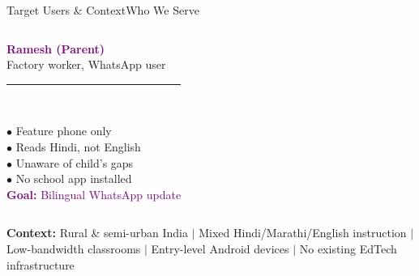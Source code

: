 \documentclass[aspectratio=169,10pt]{beamer}
\begin{document}
\begin{frame}[t,shrink=5]{Target Users \& Context}{Who We Serve}
\begin{columns}[T]
\vspace{4pt}
\colorbox{card}{\parbox{0.92\linewidth}{%
  \vspace{4pt}\centering
  \textcolor{purple}{\large\textbf{Ramesh (Parent)}}\\
  \textcolor{txtsec}{\scriptsize Factory worker, WhatsApp user}\\[4pt]
  \textcolor{cardbdr}{\rule{0.8\linewidth}{0.3pt}}\\[4pt]
  \raggedright
  \textcolor{txtsec}{\scriptsize$\bullet$} \textcolor{txt}{\scriptsize Feature phone only}\\[2pt]
  \textcolor{txtsec}{\scriptsize$\bullet$} \textcolor{txt}{\scriptsize Reads Hindi, not English}\\[2pt]
  \textcolor{txtsec}{\scriptsize$\bullet$} \textcolor{txt}{\scriptsize Unaware of child's gaps}\\[2pt]
  \textcolor{txtsec}{\scriptsize$\bullet$} \textcolor{txt}{\scriptsize No school app installed}\\[4pt]
  \textcolor{purple}{\scriptsize\textbf{Goal:} Bilingual WhatsApp update}\\[4pt]
}}

\end{columns}

\vspace{6pt}
\colorbox{card}{\parbox{0.92\linewidth}{\centering\vspace{2pt}
  \textcolor{txtsec}{\scriptsize\textbf{Context:}}\;
  \textcolor{txt}{\scriptsize
    Rural \& semi-urban India \;$|$\; Mixed Hindi/Marathi/English instruction \;$|$\;
    Low-bandwidth classrooms \;$|$\; Entry-level Android devices \;$|$\;
    No existing EdTech infrastructure}
\vspace{2pt}}}
\end{frame}
\end{document}
